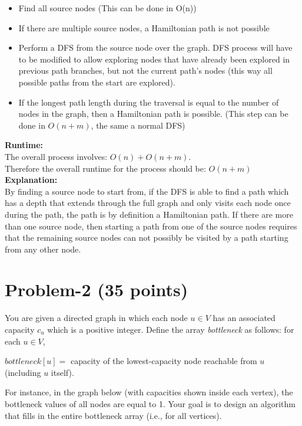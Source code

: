 \documentclass[11pt]{article}
\begin{document}
\begin{itemize}
    \item Find all source nodes (This can be done in O(n))
    \item If there are multiple source nodes, a Hamiltonian path is not possible
    \item Perform a DFS from the source node over the graph. DFS process will have to be modified to allow exploring nodes that have already been explored in previous path branches, but not the current path's nodes (this way all possible paths from the start are explored).
    \item If the longest path length during the traversal is equal to the number of nodes in the graph, then a Hamiltonian path is possible. (This step can be done in $O(n+m)$, the same a normal DFS)
\end{itemize}

\noindent \textbf{Runtime:} \\
The overall process involves: $O(n) + O(n+m)$.\\
Therefore the overall runtime for the process should be: $O(n+m)$\\

\noindent \textbf{Explanation:}\\
By finding a source node to start from, if the DFS is able to find a path which has a depth that extends through the full graph and only visits each node once during the path, the path is by definition a Hamiltonian path. If there are more than one source node, then starting a path from one of the source nodes requires that the remaining source nodes can not possibly be visited by a path starting from any other node.

\newpage
\section*{Problem-2 (35 points)}
You are given a directed graph in which each node $u \in V$ has an associated capacity $c_u$ which is a positive integer. Define the array {\em bottleneck} as follows: for each $u \in V$,
\begin{center}
    $bottleneck[u] =$ capacity of the lowest-capacity node reachable from $u$ (including $u$ itself).
\end{center}
\noindent
For instance, in the graph below (with capacities shown inside each vertex), the bottleneck values of all nodes are equal to 1.
Your goal is to design an algorithm that fills in the entire bottleneck array (i.e., for all vertices). \\
\begin{center}
\end{center}
\end{document}
